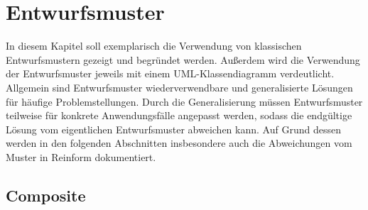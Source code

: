 \chapter{Entwurfsmuster}
\label{ch:Entwurfsmuster}

In diesem Kapitel soll exemplarisch die Verwendung von klassischen Entwurfsmustern gezeigt und begründet werden.
Außerdem wird die Verwendung der Entwurfsmuster jeweils mit einem UML-Klassendiagramm verdeutlicht.
\newline
Allgemein sind Entwurfsmuster wiederverwendbare und generalisierte Lösungen für häufige Problemstellungen.
Durch die Generalisierung müssen Entwurfsmuster teilweise für konkrete Anwendungsfälle angepasst werden, sodass die endgültige Lösung vom eigentlichen Entwurfsmuster abweichen kann.
Auf Grund dessen werden in den folgenden Abschnitten insbesondere auch die Abweichungen vom Muster in Reinform dokumentiert. 

\section{Composite}

